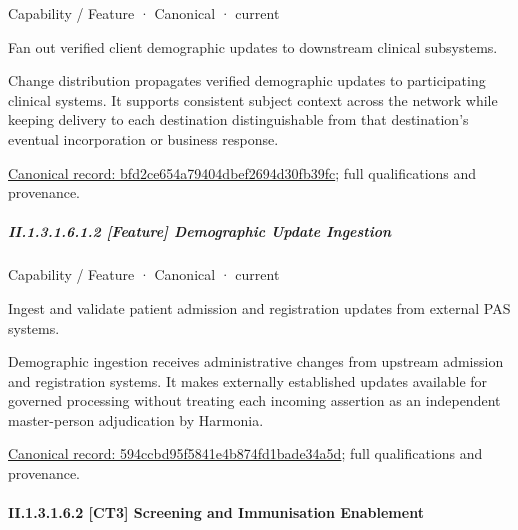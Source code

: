 \label{element:bfd2ce654a79404dbef2694d30fb39fc}
{\small Capability / Feature · Canonical · current}\par

Fan out verified client demographic updates to downstream clinical subsystems.



Change distribution propagates verified demographic updates to participating clinical systems. It supports consistent subject context across the network while keeping delivery to each destination distinguishable from that destination's eventual incorporation or business response.


{\footnotesize \href{../../../../../../../continuum/strategy/capability/feature/bfd2ce654a79404dbef2694d30fb39fc.md}{Canonical record: bfd2ce654a79404dbef2694d30fb39fc}; full qualifications and provenance.}\par
\subparagraph*{II.1.3.1.6.1.2 [Feature] Demographic Update Ingestion}
\label{navigation:II.1.3.1.6.1.2}

\label{element:594ccbd95f5841e4b874fd1bade34a5d}
{\small Capability / Feature · Canonical · current}\par

Ingest and validate patient admission and registration updates from external PAS systems.



Demographic ingestion receives administrative changes from upstream admission and registration systems. It makes externally established updates available for governed processing without treating each incoming assertion as an independent master-person adjudication by Harmonia.


{\footnotesize \href{../../../../../../../continuum/strategy/capability/feature/594ccbd95f5841e4b874fd1bade34a5d.md}{Canonical record: 594ccbd95f5841e4b874fd1bade34a5d}; full qualifications and provenance.}\par
\paragraph*{II.1.3.1.6.2 [CT3] Screening and Immunisation Enablement}
\label{navigation:II.1.3.1.6.2}


